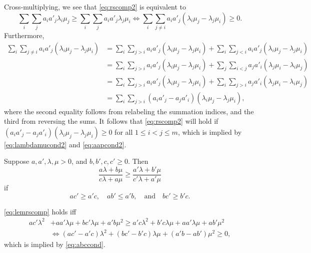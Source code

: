 \documentclass[11pt,draft]{article}
\begin{document}
\begin{pf}
Cross-multiplying, we see that \eqref{eq:rscomp2} is equivalent to
\[ \sum_i \sum_j a_i a'_j \lambda_i \mu_j \geq
\sum_i \sum_j a_i a'_j \lambda_j \mu_i \iff
\sum_i \sum_{j \neq i} a_i a'_j (\lambda_i\mu_j - \lambda_j\mu_i) \geq 0.
\]
Furthermore,
\begin{align*}
\sum_i \sum_{j \neq i} a_i a'_j (\lambda_i\mu_j - \lambda_j\mu_i)
&= \sum_i \sum_{j > i} a_i a'_j (\lambda_i\mu_j - \lambda_j\mu_i) +
\sum_i \sum_{j < i} a_i a'_j (\lambda_i\mu_j - \lambda_j\mu_i) \\
&= \sum_i \sum_{j > i} a_i a'_j (\lambda_i\mu_j - \lambda_j\mu_i) +
\sum_j \sum_{i < j} a_j a'_i (\lambda_j\mu_i - \lambda_i\mu_j) \\
&= \sum_i \sum_{j > i} a_i a'_j (\lambda_i\mu_j - \lambda_j\mu_i) +
\sum_i \sum_{j > i} a_j a'_i (\lambda_j\mu_i - \lambda_i\mu_j) \\
&= \sum_i \sum_{j > i} (a_i a'_j - a_j a'_i)(\lambda_i\mu_j - \lambda_j\mu_i),
\end{align*}
where the second equality follows from relabeling the summation indices, and the third from reversing the sums.
It follows that \eqref{eq:rscomp2} will hold if
$(a_i a'_j - a_j a'_i)(\lambda_i\mu_j - \lambda_j\mu_i) \geq 0$ for all  $1 \leq i < j \leq m$, which is implied by \eqref{eq:lambdamucond2} and \eqref{eq:aapcond2}.
\end{pf}

\begin{lem} \label{lem:rscomp}
Suppose $a,a',\lambda,\mu > 0$, and $b,b',c,c'\geq 0$. Then
\begin{equation} \label{eq:lemrscomp}
 \frac{a\lambda + b\mu}{c\lambda + a\mu} \geq
\frac{a'\lambda + b'\mu}{c'\lambda + a'\mu}
\end{equation}
if
\begin{equation} \label{eq:abccond}
ac' \geq a'c,\quad ab' \leq a'b,\quad\text{and}\quad bc' \geq b'c.
\end{equation}
\end{lem}
\begin{pf}
\eqref{eq:lemrscomp} holds iff
\begin{align*}
 ac'\lambda^2 &+ aa'\lambda\mu + bc'\lambda\mu + a'b\mu^2 \geq
a'c\lambda^2 + b'c\lambda\mu + aa'\lambda\mu + ab'\mu^2 \\
&\iff (ac'-a'c)\lambda^2 + (bc'-b'c)\lambda\mu + (a'b-ab')\mu^2 \geq 0,
\end{align*}
which is implied by \eqref{eq:abccond}.
\end{pf}
\end{document}
